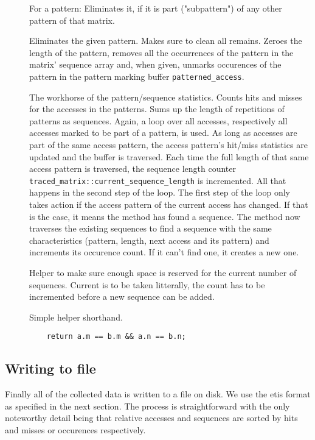 \begin{description}
\item[] For a pattern: Eliminates it, if it is part ("subpattern") of any other pattern of that matrix.
\item[] Eliminates the given pattern. Makes sure to clean all remains. \newline
	Zeroes the length of the pattern, removes all the occurrences of the pattern in the matrix' sequence array and, when given, unmarks occurences of the pattern in the pattern marking buffer \texttt{patterned\_access}.
\item[] The workhorse of the pattern/sequence statistics. Counts hits and misses for the accesses in the patterns. Sums up the length of repetitions of patterns as sequences.\newline
	Again, a loop over all accesses, respectively all accesses marked to be part of a pattern, is used. As long as accesses are part of the same access pattern, the access pattern's hit/miss statistics are updated and the buffer is traversed. Each time the full length of that same access pattern is traversed, the sequence length counter \texttt{traced\_matrix::current\_sequence\_length} is incremented. All that happens in the second step of the loop. The first step of the loop only takes action if the access pattern of the current access has changed. If that is the case, it means the method has found a sequence. The method now traverses the existing sequences to find a sequence with the same characteristics (pattern, length, next access and its pattern) and increments its occurence count. If it can't find one, it creates a new one. 
\item[] Helper to make sure enough space is reserved for the current number of sequences.\newline
	Current is to be taken litterally, the count has to be incremented before a new sequence can be added.
\item[] Simple helper shorthand.
	\begin{lstlisting}
	return a.m == b.m && a.n == b.n;
	\end{lstlisting}
\end{description}

\subsection{Writing to file}

Finally all of the collected data is written to a file on disk. We use the etis format as specified in the next section. The process is straightforward with the only noteworthy detail being that relative accesses and sequences are sorted by hits and misses or occurences respectively.
